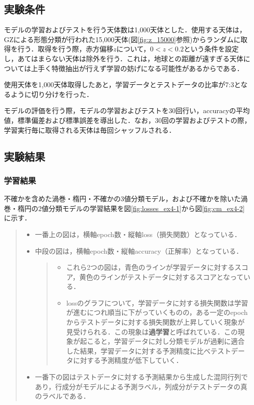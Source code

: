 \documentclass[a4j, 11pt]{jreport}
\begin{document}
\subsection{実験条件}
モデルの学習およびテストを行う天体数は1,000天体とした．使用する天体は，GZによる形態分類が行われた15,000天体(図\ref{fig:z_15000}参照)からランダムに取得を行う．取得を行う際，赤方偏移$z$について，$0 < z < 0.2$という条件を設定し，あてはまらない天体は除外を行う．これは，地球との距離が遠すぎる天体については上手く特徴抽出が行えず学習の妨げになる可能性があるからである．

使用天体を1,000天体取得したあと，学習データとテストデータの比率が7:3となるように切り分けを行った．

モデルの評価を行う際，モデルの学習およびテストを30回行い，accuracyの平均値，標準偏差および標準誤差を導出した．なお，30回の学習およびテストの際，学習実行毎に取得される天体は毎回シャッフルされる．

\subsection{実験結果}
\subsubsection{学習結果}
不確かを含めた渦巻・楕円・不確かの3値分類モデル，および不確かを除いた渦巻・楕円の2値分類モデルの学習結果を図\ref{fig:losses_ex4-1}から図\ref{fig:cm_ex4-2}に示す．

\begin{quote}
 \begin{itemize}
	\item 一番上の図は，横軸epoch数・縦軸loss（損失関数）となっている．
	\item 中段の図は，横軸epoch数・縦軸accuracy（正解率）となっている．
	\begin{quote}
	 \begin{itemize}
		\item これら2つの図は，青色のラインが学習データに対するスコア，黄色のラインがテストデータに対するスコアとなっている．
		\item lossのグラフについて，学習データに対する損失関数は学習が進むにつれ順当に下がっていくものの，ある一定のepochからテストデータに対する損失関数が上昇していく現象が見受けられる．この現象は\textbf{過学習}と呼ばれている．この現象が起こると，学習データに対し分類モデルが過剰に適合した結果，学習データに対する予測精度に比べテストデータに対する予測精度が低下していく．
	 \end{itemize}
	\end{quote}
	\item 一番下の図はテストデータに対する予測結果から生成した混同行列であり，行成分がモデルによる予測ラベル，列成分がテストデータの真のラベルである．
 \end{itemize}
\end{quote}
\end{document}
